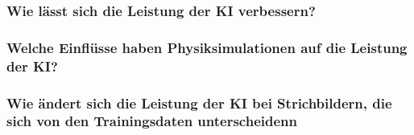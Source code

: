 \subsubsection*{Wie lässt sich die Leistung der KI verbessern?}



\subsubsection*{Welche Einflüsse haben Physiksimulationen auf die Leistung der KI?}


\subsubsection*{Wie ändert sich die Leistung der KI bei Strichbildern, die sich von den Trainingsdaten unterscheidenn}

